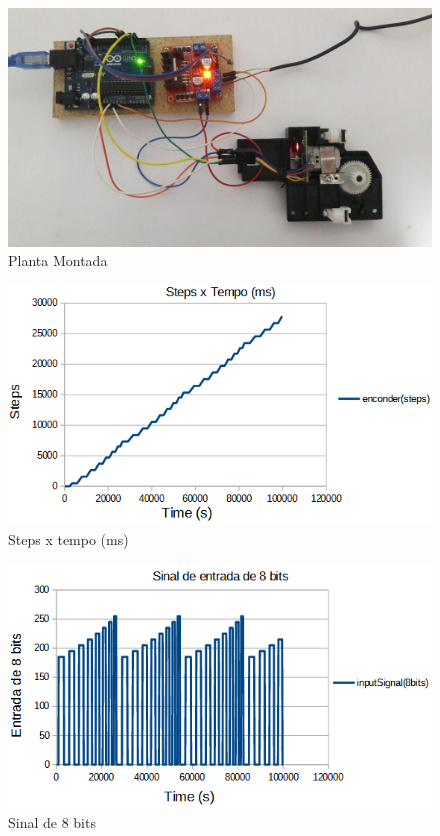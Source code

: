 \documentclass[a4paper,11pt]{article}
\begin{document}
\begin{figure}[H]
    \centering
    \includegraphics[width=\linewidth]{src/tex/img/full_system.jpg}
    \caption{Planta Montada}
    \label{fig:pid_tinkercad}
\end{figure}

\begin{figure}[H]
    \centering
    \includegraphics[width=\linewidth]{src/tex/img/grafico_steps.PNG}
    \caption{Steps x tempo (ms)}
    \label{fig:steps}
\end{figure}

\begin{figure}[H]
    \centering
    \includegraphics[width=\linewidth]{src/tex/img/sinal_8_bits.PNG} 
    \caption{Sinal de 8 bits}
    \label{fig:sinal8bits}
\end{figure}
\end{document}
